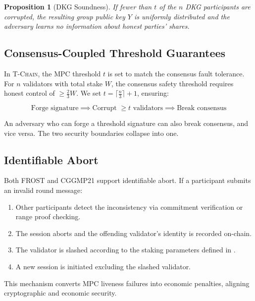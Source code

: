 \documentclass[11pt,letterpaper]{article}
\newtheorem{proposition}[theorem]{Proposition}
\theoremstyle{definition}
\theoremstyle{remark}
\newcommand{\TChain}{\textsc{T-Chain}}
\begin{document}
\begin{proposition}[DKG Soundness]
If fewer than $t$ of the $n$ DKG participants are corrupted, the resulting group public key $Y$ is uniformly distributed and the adversary learns no information about honest parties' shares.
\end{proposition}

\subsection{Consensus-Coupled Threshold Guarantees}

In \TChain{}, the MPC threshold $t$ is set to match the consensus fault tolerance. For $n$ validators with total stake $W$, the consensus safety threshold requires honest control of $\geq \frac{2}{3}W$. We set $t = \lceil \frac{n}{3} \rceil + 1$, ensuring:

\begin{equation}
\text{Forge signature} \implies \text{Corrupt } \geq t \text{ validators} \implies \text{Break consensus}
\end{equation}

An adversary who can forge a threshold signature can also break consensus, and vice versa. The two security boundaries collapse into one.

\subsection{Identifiable Abort}

Both FROST and CGGMP21 support identifiable abort. If a participant submits an invalid round message:

\begin{enumerate}
\item Other participants detect the inconsistency via commitment verification or range proof checking.
\item The session aborts and the offending validator's identity is recorded on-chain.
\item The validator is slashed according to the staking parameters defined in \cite{zoo-tokenomics}.
\item A new session is initiated excluding the slashed validator.
\end{enumerate}

This mechanism converts MPC liveness failures into economic penalties, aligning cryptographic and economic security.

\end{document}
